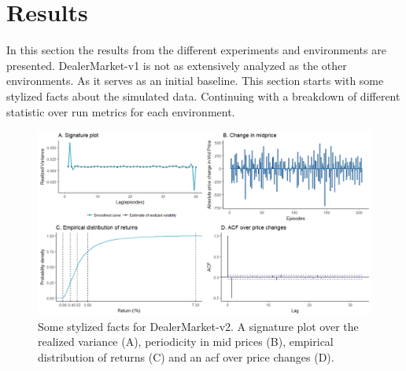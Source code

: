\documentclass{kththesis}
\theoremstyle{definition}
\begin{document}
\chapter{Results}\label{ch:6}
 In this section the results from the different experiments and environments are presented. DealerMarket-v1 is not as extensively analyzed as the other environments. As it serves as an initial baseline. This section starts with some stylized facts about the simulated data. Continuing with a breakdown of different statistic over run metrics for each environment. 

\begin{figure}[H]
		\centering
		\includegraphics[scale=.5]{dmv1_sf_multi.png}
		\caption{Some stylized facts for DealerMarket-v2. A signature plot over the realized variance (A), periodicity in mid prices (B), empirical distribution of returns (C) and an acf over price changes (D). }
		\label{fig:sf1}
\end{figure}
\end{document}
